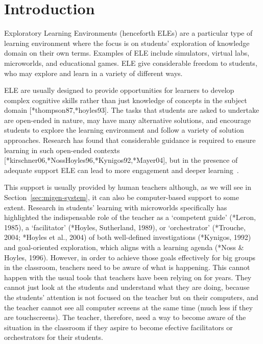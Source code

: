 \section{Introduction}
\label{sec:introduction}

Exploratory Learning Environments (henceforth ELEs) are a particular
type of learning environment where the focus is on students'
exploration of knowledge domain on their own terms. Examples of ELE
include simulators, virtual labs, microworlds, and educational
games. ELE give considerable freedom to students, who may explore and
learn in a variety of different ways.

ELE are usually designed to provide opportunities for learners to
develop complex cognitive skills rather than just knowledge of concepts in the subject
domain [*thompson87,*hoyles93]. The tasks that students are asked to
undertake are open-ended in nature, may have many alternative
solutions, and encourage students to explore the learning
environment and follow a variety of solution approaches. Research
has found that considerable guidance is required to ensure learning in
such open-ended contexts [*kirschner06,*NossHoyles96,*Kynigos92,*Mayer04],
but in the presence of adequate support ELE can lead to more engagement
and deeper learning~\cite{deeperLearning}. 

This support is usually provided by human teachers although, as we
will see in Section~\ref{sec:migen-system}, it can also be
computer-based support to some extent.
Research in students’ learning with microworlds specifically has highlighted
the indispensable role of the teacher as a ‘competent guide’ (*Leron,
1985), a ‘facilitator’ (*Hoyles, Sutherland, 1989), or ‘orchestrator’
(*Trouche, 2004; *Hoyles et al., 2004) of both well-defined
investigations (*Kynigos, 1992) and goal-oriented exploration, which
aligns with a learning agenda (*Noss \& Hoyles, 1996). However, in
order to achieve those goals effectively for big groups in the
classroom, teachers need to be aware of what is happening. This cannot
happen with the usual tools that teachers have been relying on for
years. They cannot just look at the students and understand what they
are doing, because the students' attention is not focused on the
teacher but on their computers, and the teacher cannot see all
computer screens at the same time (much less if they are
touchscreens). The teacher, therefore, need a way to become aware of
the situation in the classroom if they aspire to become efective
facilitators or orchestrators for their students. 

